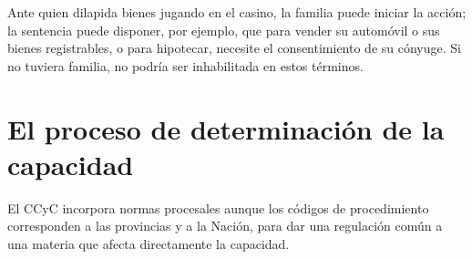 \documentclass[12pt,oneside]{book}
\begin{document}
\begin{ejemplo}
Ante quien dilapida bienes jugando en el casino, la familia puede iniciar la acción; la sentencia puede disponer, por ejemplo, que para vender su automóvil o sus bienes registrables, o para hipotecar, necesite el consentimiento de su cónyuge. Si no tuviera familia, no podría ser inhabilitada en estos términos.
\end{ejemplo}

\section{El proceso de determinación de la capacidad}

El CCyC incorpora normas procesales aunque los códigos de procedimiento corresponden a las provincias y a la Nación, para dar una regulación común a una materia que afecta directamente la capacidad.
\end{document}
